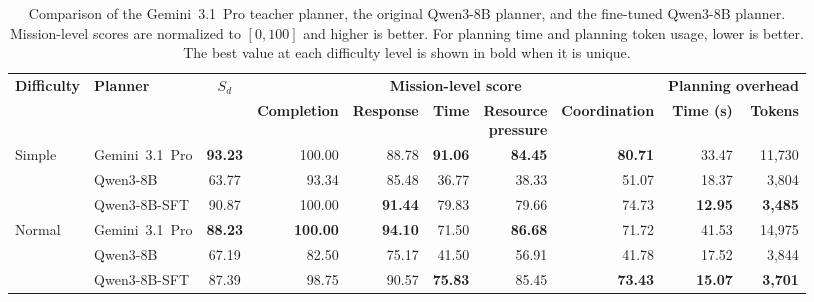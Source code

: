 \begin{table}[!t]
    \centering
    \caption{Comparison of the Gemini~3.1~Pro teacher planner, the original
    Qwen3-8B planner, and the fine-tuned Qwen3-8B planner. Mission-level scores
    are normalized to $[0,100]$ and higher is better. For planning time and
    planning token usage, lower is better. The best value at each difficulty level is
    shown in bold when it is unique.}
    \label{tab:fine-tuned-planner-results}
    \footnotesize
    \setlength{\tabcolsep}{1.2pt}
    \renewcommand{\arraystretch}{1.12}
    \begin{tabular*}{\textwidth}{@{\extracolsep{\fill}}llcrrrrrrr@{}}
        \toprule
        \multirow{2}{*}{\textbf{Difficulty}}
        & \multirow{2}{*}{\textbf{Planner}}
        & \multirow{2}{*}{\textbf{$S_d$}}
        & \multicolumn{5}{c}{\textbf{Mission-level score}}
        & \multicolumn{2}{c}{\textbf{Planning overhead}} \\
        \cmidrule(lr){4-8}\cmidrule(l){9-10}
        & &
        & \textbf{Completion}
        & \textbf{Response}
        & \textbf{Time}
        & \makecell{\textbf{Resource}\\\textbf{pressure}}
        & \textbf{Coordination}
        & \textbf{Time (s)}
        & \textbf{Tokens} \\
        \midrule

        Simple & Gemini~3.1~Pro
        & \textbf{93.23} & 100.00 & 88.78 & \textbf{91.06}
        & \textbf{84.45} & \textbf{80.71} & 33.47 & 11,730 \\
        & Qwen3-8B
        & 63.77 & 93.34 & 85.48 & 36.77 & 38.33 & 51.07 & 18.37 & 3,804 \\
        & Qwen3-8B-SFT
        & 90.87 & 100.00 & \textbf{91.44} & 79.83
        & 79.66 & 74.73 & \textbf{12.95} & \textbf{3,485} \\
        \addlinespace

        Normal & Gemini~3.1~Pro
        & \textbf{88.23} & \textbf{100.00} & \textbf{94.10} & 71.50
        & \textbf{86.68} & 71.72 & 41.53 & 14,975 \\
        & Qwen3-8B
        & 67.19 & 82.50 & 75.17 & 41.50 & 56.91 & 41.78 & 17.52 & 3,844 \\
        & Qwen3-8B-SFT
        & 87.39 & 98.75 & 90.57 & \textbf{75.83}
        & 85.45 & \textbf{73.43} & \textbf{15.07} & \textbf{3,701} \\
        \bottomrule
    \end{tabular*}
\end{table}
